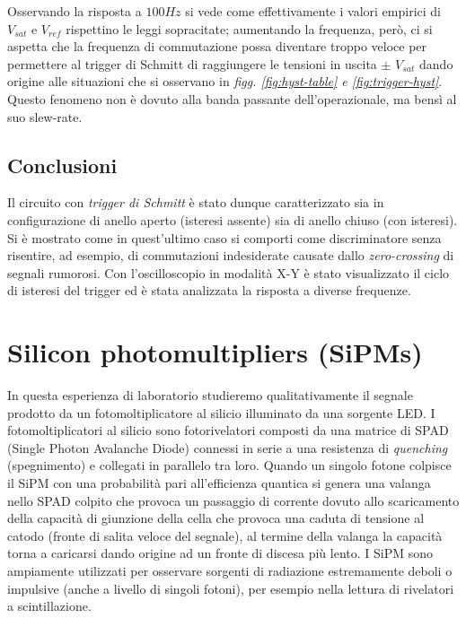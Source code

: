\documentclass[journal]{IEEEtran}
\begin{document}
Osservando la risposta a $100 Hz$ si vede come effettivamente i valori empirici di $V_{sat}$ e $V_{ref}$ rispettino le leggi sopracitate; aumentando la frequenza, però, ci si aspetta che la frequenza di commutazione possa diventare troppo veloce per permettere al trigger di Schmitt di raggiungere le tensioni in uscita $\pm$ $V_{sat}$ dando origine alle situazioni che si osservano in \textit{figg. \ref{fig:hyst-table} e \ref{fig:trigger-hyst}}. Questo fenomeno non è dovuto alla banda passante dell'operazionale, ma bensì al suo slew-rate.

\subsection{Conclusioni}
Il circuito con \textit{trigger di Schmitt} è stato dunque caratterizzato sia in configurazione di anello aperto (isteresi assente) sia di anello chiuso (con isteresi). Si è mostrato come in quest'ultimo caso si comporti come discriminatore senza risentire, ad esempio, di commutazioni indesiderate causate dallo \textit{zero-crossing} di segnali rumorosi.
Con l'oscilloscopio in modalità X-Y è stato visualizzato il ciclo di isteresi del trigger ed è stata analizzata la risposta a diverse frequenze. 



\section{\textbf{Silicon photomultipliers (SiPMs)}} %
In questa esperienza di laboratorio studieremo qualitativamente il segnale prodotto da un fotomoltiplicatore al silicio illuminato da una sorgente LED. I fotomoltiplicatori al silicio sono fotorivelatori composti da una matrice di SPAD (Single Photon Avalanche Diode) connessi in serie a una resistenza di \textit{quenching} (spegnimento) e collegati in parallelo tra loro. Quando un singolo fotone colpisce il SiPM con una probabilità pari all'efficienza quantica si genera una valanga nello SPAD colpito che provoca un passaggio di corrente dovuto allo scaricamento della capacità di giunzione della cella che provoca una caduta di tensione al catodo (fronte di salita veloce del segnale), al termine della valanga la capacità torna a caricarsi dando origine ad un fronte di discesa più lento. I SiPM sono ampiamente utilizzati per osservare sorgenti di radiazione estremamente deboli o impulsive (anche a livello di singoli fotoni), per esempio nella lettura di rivelatori a scintillazione.
\end{document}

